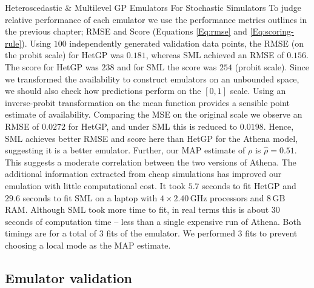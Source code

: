 \begin{chapter}{Heteroscedastic \& Multilevel GP Emulators For Stochastic Simulators\label{Ch:Hetsml}}
To judge relative performance of each emulator we use the performance metrics outlines in the previous chapter; RMSE  and Score (Equations \ref{Eq:rmse} and \ref{Eq:scoring-rule}). Using $100$ independently generated validation data points, the RMSE (on the probit scale) for HetGP was $0.181$, whereas SML achieved an RMSE of $0.156$. The score for HetGP was $238$ and for SML the score was $254$ (probit scale). Since we transformed the availability to construct emulators on an unbounded space, we should also check how predictions perform on the $[0,1]$ scale. Using an inverse-probit transformation on the mean function provides a sensible point estimate of availability. Comparing the MSE on the original scale  we observe an RMSE of $0.0272$ for HetGP, and under SML this is reduced to $0.0198$. Hence, SML achieves better RMSE and score here than HetGP for the Athena model, suggesting it is a better emulator. Further, our MAP estimate of $\rho$ is $\hat{\rho} = 0.51$. This suggests a moderate correlation between the two versions of Athena. The additional information extracted from cheap simulations has improved our emulation with little computational cost. It took $5.7$ seconds to fit HetGP and $29.6$ seconds to fit SML on a laptop with $4 \times 2.40\,\text{GHz}$ processors and $8\,\text{GB}$ RAM. Although SML took more time to fit, in real terms this is about $30$ seconds of computation time -- less than a single  expensive run of Athena. Both timings are for a total of $3$ fits of the emulator. We performed $3$ fits to prevent choosing a local mode as the MAP estimate.%

\subsection{Emulator validation}


\end{chapter}
